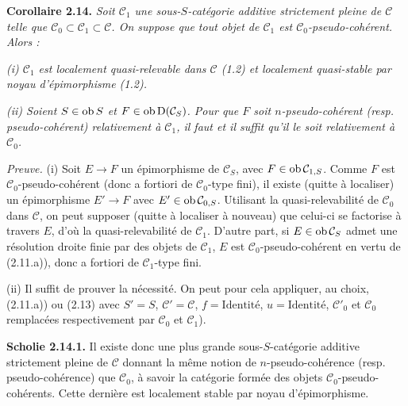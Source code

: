 \documentclass[11pt]{article}
\begin{document}
\textbf{Corollaire 2.14.} \emph{Soit \(\mathcal C_1\) une sous-\(S\)-catégorie additive strictement pleine de \(\mathcal C\) telle que \(\mathcal C_0\subset\mathcal C_1\subset\mathcal C\). On suppose que tout objet de \(\mathcal C_1\) est \(\mathcal C_0\)-pseudo-cohérent. Alors :}

\emph{(i) \(\mathcal C_1\) est localement quasi-relevable dans \(\mathcal C\) (1.2) et localement quasi-stable par noyau d'épimorphisme (1.2).}

\emph{(ii) Soient \(S\in\operatorname{ob} S\) et \(F\in\operatorname{ob}\mathrm D(\mathcal C_S)\). Pour que \(F\) soit \(n\)-pseudo-cohérent (resp. pseudo-cohérent) relativement à \(\mathcal C_1\), il faut et il suffit qu'il le soit relativement à \(\mathcal C_0\).}

\emph{Preuve.} (i) Soit \(E\to F\) un épimorphisme de \(\mathcal C_S\), avec \(F\in\operatorname{ob}\mathcal C_{1,S}\). Comme \(F\) est \(\mathcal C_0\)-pseudo-cohérent (donc a fortiori de \(\mathcal C_0\)-type fini), il existe (quitte à localiser) un épimorphisme \(E'\to F\) avec \(E'\in\operatorname{ob}\mathcal C_{0,S}\). Utilisant la quasi-relevabilité de \(\mathcal C_0\) dans \(\mathcal C\), on peut supposer (quitte à localiser à nouveau) que celui-ci se factorise à travers \(E\), d'où la quasi-relevabilité de \(\mathcal C_1\). D'autre part, si \(E\in\operatorname{ob}\mathcal C_S\) admet une résolution droite finie par des objets de \(\mathcal C_1\), \(E\) est \(\mathcal C_0\)-pseudo-cohérent en vertu de (2.11.a)), donc a fortiori de \(\mathcal C_1\)-type fini.

(ii) Il suffit de prouver la nécessité. On peut pour cela appliquer, au choix, (2.11.a)) ou (2.13) avec \(S'=S\), \(\mathcal C'=\mathcal C\), \(f=\text{Identité}\), \(u=\text{Identité}\), \(\mathcal C'_0\) et \(\mathcal C_0\) remplacées respectivement par \(\mathcal C_0\) et \(\mathcal C_1\)).

\textbf{Scholie 2.14.1.} Il existe donc une plus grande sous-\(S\)-catégorie additive strictement pleine de \(\mathcal C\) donnant la même notion de \(n\)-pseudo-cohérence (resp. pseudo-cohérence) que \(\mathcal C_0\), à savoir la catégorie formée des objets \(\mathcal C_0\)-pseudo-cohérents. Cette dernière est localement stable par noyau d'épimorphisme.
\end{document}
